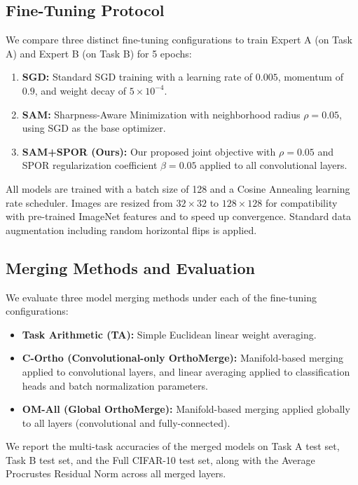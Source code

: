 \documentclass{article}
\theoremstyle{plain}
\theoremstyle{definition}
\theoremstyle{remark}
\begin{document}
\subsection{Fine-Tuning Protocol}
We compare three distinct fine-tuning configurations to train Expert A (on Task A) and Expert B (on Task B) for 5 epochs:
\begin{enumerate}
    \item \textbf{SGD:} Standard SGD training with a learning rate of $0.005$, momentum of $0.9$, and weight decay of $5\times 10^{-4}$.
    \item \textbf{SAM:} Sharpness-Aware Minimization with neighborhood radius $\rho = 0.05$, using SGD as the base optimizer.
    \item \textbf{SAM+SPOR (Ours):} Our proposed joint objective with $\rho = 0.05$ and SPOR regularization coefficient $\beta = 0.05$ applied to all convolutional layers.
\end{enumerate}
All models are trained with a batch size of 128 and a Cosine Annealing learning rate scheduler. Images are resized from $32\times 32$ to $128\times 128$ for compatibility with pre-trained ImageNet features and to speed up convergence. Standard data augmentation including random horizontal flips is applied.

\subsection{Merging Methods and Evaluation}
We evaluate three model merging methods under each of the fine-tuning configurations:
\begin{itemize}
    \item \textbf{Task Arithmetic (TA):} Simple Euclidean linear weight averaging.
    \item \textbf{C-Ortho (Convolutional-only OrthoMerge):} Manifold-based merging applied to convolutional layers, and linear averaging applied to classification heads and batch normalization parameters.
    \item \textbf{OM-All (Global OrthoMerge):} Manifold-based merging applied globally to all layers (convolutional and fully-connected).
\end{itemize}
We report the multi-task accuracies of the merged models on Task A test set, Task B test set, and the Full CIFAR-10 test set, along with the Average Procrustes Residual Norm across all merged layers.
\end{document}

